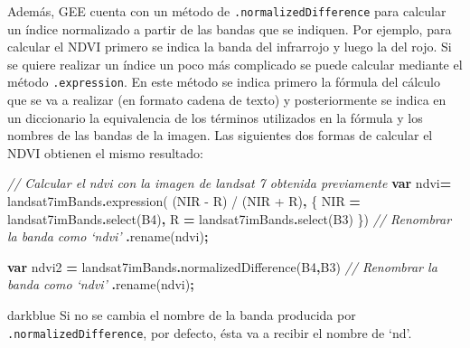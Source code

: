 \documentclass[
  12pt,
  letterpaper,
  twoside]{book}
\newenvironment{Shaded}{\begin{snugshade}}{\end{snugshade}}
\newcommand{\CommentTok}[1]{\textcolor[rgb]{0.56,0.35,0.01}{\textit{#1}}}
\newcommand{\FunctionTok}[1]{\textcolor[rgb]{0.00,0.00,0.00}{#1}}
\newcommand{\KeywordTok}[1]{\textcolor[rgb]{0.13,0.29,0.53}{\textbf{#1}}}
\newcommand{\NormalTok}[1]{#1}
\newcommand{\OperatorTok}[1]{\textcolor[rgb]{0.81,0.36,0.00}{\textbf{#1}}}
\newcommand{\StringTok}[1]{\textcolor[rgb]{0.31,0.60,0.02}{#1}}
\begin{document}
Además, GEE cuenta con un método de \texttt{.normalizedDifference} para calcular un índice normalizado a partir de las bandas que se indiquen. Por ejemplo, para calcular el NDVI primero se indica la banda del infrarrojo y luego la del rojo. Si se quiere realizar un índice un poco más complicado se puede calcular mediante el método \texttt{.expression}. En este método se indica primero la fórmula del cálculo que se va a realizar (en formato cadena de texto) y posteriormente se indica en un diccionario la equivalencia de los términos utilizados en la fórmula y los nombres de las bandas de la imagen. Las siguientes dos formas de calcular el NDVI obtienen el mismo resultado:

\begin{Shaded}
\begin{Highlighting}[]
\CommentTok{// Calcular el ndvi con la imagen de landsat 7 obtenida previamente}
\KeywordTok{var}\NormalTok{ ndvi}\OperatorTok{=}\NormalTok{ landsat7imBands}\OperatorTok{.}\FunctionTok{expression}\NormalTok{( }\StringTok{\textquotesingle{}(NIR {-} R) / (NIR + R)\textquotesingle{}}\OperatorTok{,}\NormalTok{ \{}
  \StringTok{\textquotesingle{}NIR\textquotesingle{}} \OperatorTok{=}\NormalTok{ landsat7imBands}\OperatorTok{.}\FunctionTok{select}\NormalTok{(}\StringTok{\textquotesingle{}B4\textquotesingle{}}\NormalTok{)}\OperatorTok{,}
  \StringTok{\textquotesingle{}R\textquotesingle{}} \OperatorTok{=}\NormalTok{ landsat7imBands}\OperatorTok{.}\FunctionTok{select}\NormalTok{(}\StringTok{\textquotesingle{}B3\textquotesingle{}}\NormalTok{)}
\NormalTok{\})}
  \CommentTok{// Renombrar la banda como ‘ndvi’}
  \OperatorTok{.}\FunctionTok{rename}\NormalTok{(}\StringTok{\textquotesingle{}ndvi\textquotesingle{}}\NormalTok{)}\OperatorTok{;}
  
\KeywordTok{var}\NormalTok{ ndvi2 }\OperatorTok{=}\NormalTok{ landsat7imBands}\OperatorTok{.}\FunctionTok{normalizedDifference}\NormalTok{(}\StringTok{\textquotesingle{}B4\textquotesingle{}}\OperatorTok{,}\StringTok{\textquotesingle{}B3\textquotesingle{}}\NormalTok{)}
  \CommentTok{// Renombrar la banda como ‘ndvi’}
  \OperatorTok{.}\FunctionTok{rename}\NormalTok{(}\StringTok{\textquotesingle{}ndvi\textquotesingle{}}\NormalTok{)}\OperatorTok{;}
\end{Highlighting}
\end{Shaded}

\begin{bluebox2}

\begin{awesomeblock}{5pt}{\faLightbulb}{darkblue}
Si no se cambia el nombre de la banda producida por \texttt{.normalizedDifference}, por defecto, ésta va a recibir el nombre de `nd'.

\end{awesomeblock}

\end{bluebox2}
\end{document}
